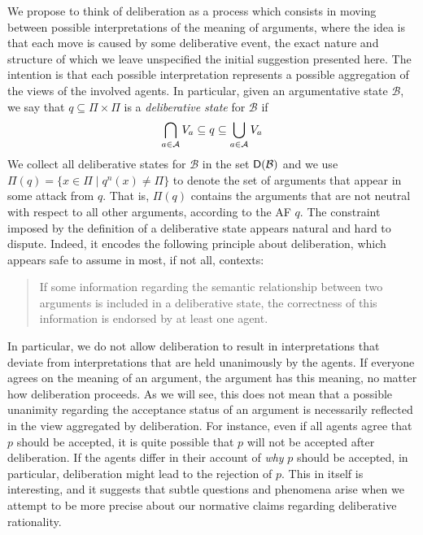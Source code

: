\documentclass[greybox]{svmult}
\newcommand{\neu}[2]{#1^n(#2)}
\newcommand{\dstate}[1]{\sf D({#1}) }
\newcommand{\views}{\mathcal B}
\begin{document}
We propose to think of deliberation as a process which consists in moving between possible interpretations of the meaning of arguments, where the idea is that each move is caused by some deliberative event, the exact nature and structure of which we leave unspecified the initial suggestion presented here. The intention is that each possible interpretation represents a possible aggregation of the views of the involved agents. In particular, given an argumentative state $\views$, we say that $q \subseteq \Pi \times \Pi$ is a \emph{deliberative state} for $\views$ if
\begin{equation}\label{eq:ds}
\bigcap_{a \in \agents}V_a \subseteq q \subseteq \bigcup_{a \in \agents}V_a
\end{equation}
We collect all deliberative states for $\views$ in the set $\dstate \views$ and we use $\Pi(q) = \{x \in \Pi \mid \neu q x \not = \Pi\}$ to denote the set of arguments that appear in some attack from $q$. That is, $\Pi(q)$ contains the arguments that are not neutral with respect to all other arguments, according to the AF $q$. The constraint imposed by the definition of a deliberative state appears natural and hard to dispute. Indeed, it encodes the following principle about deliberation, which appears safe to assume in most, if not all, contexts:

\begin{quote}\label{principle}
If some information regarding the semantic relationship between two arguments is included in a deliberative state, the correctness of this information is endorsed by at least one agent. 
\end{quote}

In particular, we do not allow deliberation to result in interpretations that deviate from interpretations that are held unanimously by the agents. If everyone agrees on the meaning of an argument, the argument has this meaning, no matter how deliberation proceeds. As we will see, this does not mean that a possible unanimity regarding the acceptance status of an argument is necessarily reflected in the view aggregated by deliberation. For instance, even if all agents agree that $p$ should be accepted, it is quite possible that $p$ will not be accepted after deliberation. If the agents differ in their account of \emph{why} $p$ should be accepted, in particular, deliberation might lead to the rejection of $p$. This in itself is interesting, and it suggests that subtle questions and phenomena arise when we attempt to be more precise about our normative claims regarding deliberative rationality.
\end{document}
